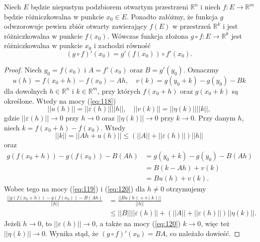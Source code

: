 \documentclass[leqno]{article}
\begin{document}
\begin{justify}
\begin{theorem}
{
    Niech $E$ będzie niepustym podzbiorem otwartym przestrzeni $\mathbb{R}^n$ i niech $f : E \to \mathbb{R}^m$ będzie różniczkowalna w punkcie $x_0 \in E$.
    Ponadto załóżmy, że funkcja $g$ odwzorowuje pewien zbiór otwarty zawierający $f(E)$ w przestrzeń $\mathbb{R}^k$ i jest różniczkowalna 
    w punkcie $f(x_0)$. Wówczas funkcja złożona $g \circ f : E \to \mathbb{R}^k$ jest różniczkowalna w punkcie $x_0$ i zachodzi równość 
    \[
        (g \circ f)'(x_0) = g'(f(x_0)) \circ f'(x_0).
    \]
}
\end{theorem}
\begin{proof}
    Niech $y_0 = f(x_0)$ i $A = f'(x_0)$ oraz $B = g'(y_0)$. Oznaczmy
    \[
        u(h) = f(x_0 + h) - f(x_0) - Ah, \quad v(k) = g(y_0 + k) - g(y_0) - Bk
    \]
    dla dowolnych $h \in \mathbb{R}^n$ i $k \in \mathbb{R}^m$, przy których $f(x_0 + h)$ oraz $g(x_0 + k)$ są określone.
    Wtedy na mocy (\ref{eq:118}) 
    \begin{equation}\label{eq:119}
        ||u(h)|| = ||\varepsilon(h)||||h||, \quad ||v(k)|| = ||\eta(k)||||k||,
    \end{equation}
    gdzie $||\varepsilon(h)|| \to 0$ przy $h \to 0$ oraz $||\eta(k)|| \to 0$ przy $k \to 0$.
    Przy danym $h$, niech $k = f(x_0 + h) - f(x_0)$. Wtedy
    \begin{equation}\label{eq:120}
        ||k|| = ||Ah + u(h)|| \leqslant (||A|| + ||\varepsilon(h)||)||h||
    \end{equation}
    oraz
    \begin{align*}
        g(f(x_0 + h)) - g(f(x_0)) - B(Ah) &= g(y_0 + k) - g(y_0) - B(Ah) \\
        &=B(k - Ah) + v(k) \\
        &= Bu(h) + v(k).
    \end{align*}
    Wobec tego na mocy (\ref{eq:119}) i (\ref{eq:120}) dla $h \neq 0$ otrzymujemy 
    \begin{align*}
        \frac{||g(f(x_0 + h)) - g(f(x_0)) - B(Ah)}{||h||} &= \frac{||Bu(h) + v(k)||}{||h||} \\
            &\leqslant ||B||||\varepsilon(h)|| + (||A|| + ||\varepsilon(h)||)||\eta(k)||.
    \end{align*}
    Jeżeli $h \to 0$, to $||\varepsilon(h)|| \to 0$, a także na mocy (\ref{eq:120}) $k \to 0$, więc też 
    $||\eta(k)|| \to 0$. Wynika stąd, że $(g \circ f)'(x_0) = BA$, co należało dowieść.    
\end{proof}


\end{justify}
\end{document}
